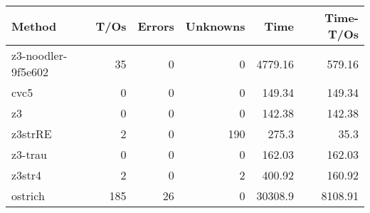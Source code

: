 \begin{tabular}{lrrrrr}
\hline
 Method             &   T/Os &   Errors &   Unknowns &     Time &   Time-T/Os \\
\hline
 z3-noodler-9f5e602 &     35 &        0 &          0 &  4779.16 &      579.16 \\
 cvc5               &      0 &        0 &          0 &   149.34 &      149.34 \\
 z3                 &      0 &        0 &          0 &   142.38 &      142.38 \\
 z3strRE            &      2 &        0 &        190 &   275.3  &       35.3  \\
 z3-trau            &      0 &        0 &          0 &   162.03 &      162.03 \\
 z3str4             &      2 &        0 &          2 &   400.92 &      160.92 \\
 ostrich            &    185 &       26 &          0 & 30308.9  &     8108.91 \\
\hline
\end{tabular}
